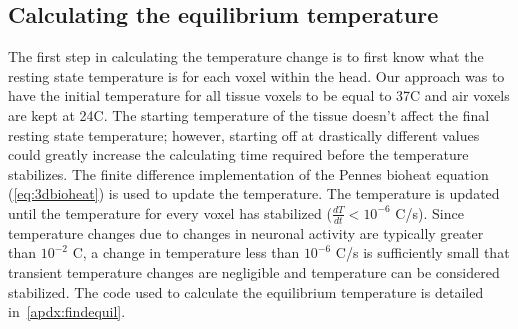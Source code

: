   
    \subsection{\label{sec:calcequilT} Calculating the equilibrium temperature}
  The first step in calculating the temperature change is to first know what the resting state temperature is for each voxel within the head. Our approach was to have the initial temperature for all tissue voxels to be equal to 37\degree C and air voxels are kept at 24\degree C.  The starting temperature of the tissue doesn't affect the final resting state temperature; however, starting off at drastically different values could greatly increase the calculating time required before the temperature stabilizes. The finite difference implementation of the Pennes bioheat equation (\cref{eq:3dbioheat}) is used to update the temperature.  The temperature is updated until the temperature for every voxel has stabilized ($\frac{dT}{dt} < 10^{-6}$ \degree C/s).  Since temperature changes due to changes in neuronal activity are typically greater than $10^{-2}$ \degree C, a change in temperature less than $10^{-6}$ \degree C/s is sufficiently small that transient temperature changes are negligible and temperature can be considered stabilized.  The code used to calculate the equilibrium temperature is detailed in~\cref{apdx:findequil}.
  
